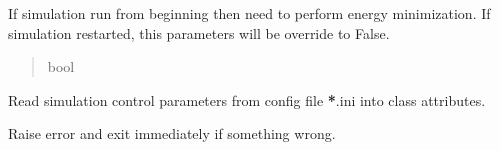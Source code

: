 \documentclass[letterpaper,10pt,english]{sphinxmanual}
\begin{document}
\begin{fulllineitems}
\begin{fulllineitems}
\begin{quote}
\begin{description}
\end{description}\end{quote}

\end{fulllineitems}


\begin{fulllineitems}
\label{\detokenize{modules/dynamics:hps.dynamics.Dynamics.minimize}}
\pysigstartsignatures
{}
\pysigstopsignatures
\sphinxAtStartPar
If simulation run from beginning then need to perform energy minimization. If simulation restarted, this
parameters will be override to False.
\begin{quote}\begin{description}
\sphinxAtStartPar
bool

\end{description}\end{quote}

\end{fulllineitems}


\begin{fulllineitems}
\label{\detokenize{modules/dynamics:hps.dynamics.Dynamics.__init__}}
\pysigstartsignatures
{}
\pysigstopsignatures
\end{fulllineitems}


\begin{fulllineitems}
\label{\detokenize{modules/dynamics:hps.dynamics.Dynamics.read_config}}
\pysigstartsignatures
{}
\pysigstopsignatures
\sphinxAtStartPar
Read simulation control parameters from config file {\color{red}\bfseries{}*}.ini into class attributes.
\begin{description}
\sphinxAtStartPar
Raise error and exit immediately if something wrong.

\end{description}

\end{fulllineitems}


\end{fulllineitems}
\end{document}
